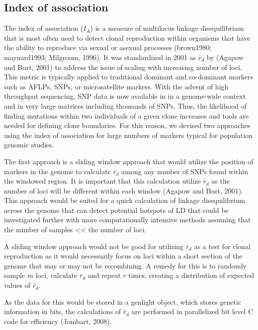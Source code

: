\documentclass{frontiersSCNS} %
\begin{document}
\subsection*{Index of association}\label{index-of-association}

The index of association (\(I_A\)) is a measure of multilocus linkage
disequilibrium that is most often used to detect clonal reproduction
within organisms that have the ability to reproduce via sexual or
asexual processes (brown1980; maynard1993; Milgroom, 1996). It was
standardized in 2001 as \(\bar{r}_d\) by (Agapow and Burt, 2001) to
address the issue of scaling with increasing number of loci. This metric
is typically applied to traditional dominant and co-dominant markers
such as AFLPs, SNPs, or microsatellite markers. With the advent of high
throughput sequencing, SNP data is now available in in a genome-wide
context and in very large matrices including thousands of SNPs. Thus,
the likelihood of finding mutations within two individuals of a given
clone increases and tools are needed for defining clone boundaries. For
this reason, we devised two approaches using the index of association
for large numbers of markers typical for population genomic studies.

The first approach is a sliding window approach that would utilize the
position of markers in the genome to calculate \(\bar{r}_d\) among any
number of SNPs found within the windowed region. It is important that
this calculation utilize \(\bar{r}_d\) as the number of loci will be
different within each window (Agapow and Burt, 2001). This approach
would be suited for a quick calculation of linkage disequilibrium across
the genome that can detect potential hotspots of LD that could be
investigated further with more computationally intensive methods
assuming that the number of samples \textless{}\textless{} the number of
loci.

A sliding window approach would not be good for utilizing \(\bar{r}_d\)
as a test for clonal reproduction as it would necessarily focus on loci
within a short section of the genome that may or may not be recombining.
A remedy for this is to randomly sample \(m\) loci, calculate
\(\bar{r}_d\) and repeat \(r\) times, creating a distribution of
expected values of \(\bar{r}_d\).

As the data for this would be stored in a genlight object, which stores
genetic information in bits, the calculations of \(\bar{r}_d\) are
performed in parallelized bit level C code for efficiency (Jombart,
2008).
\end{document}
